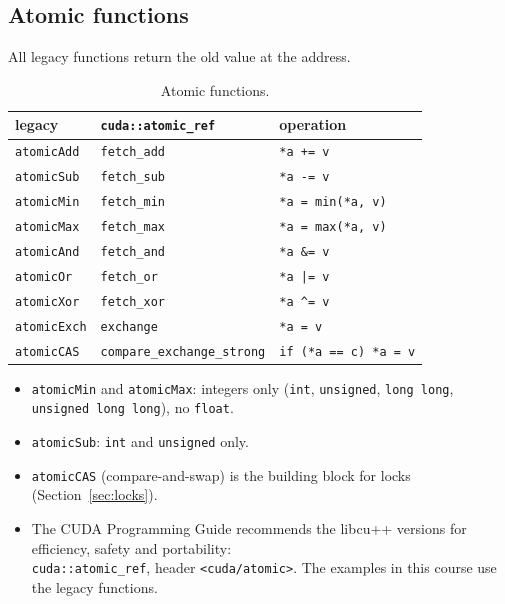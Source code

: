 \documentclass[main.tex]{subfiles}
\begin{document}
\subsection{Atomic functions}

All legacy functions return the old value at the address.

\begin{table}[H]
\centering
\begin{tabular}{l|l|l}
legacy & \texttt{cuda::atomic\_ref} & operation \\ \hline
\texttt{atomicAdd} & \texttt{fetch\_add} & \texttt{*a += v} \\
\texttt{atomicSub} & \texttt{fetch\_sub} & \texttt{*a -= v} \\
\texttt{atomicMin} & \texttt{fetch\_min} & \texttt{*a = min(*a, v)} \\
\texttt{atomicMax} & \texttt{fetch\_max} & \texttt{*a = max(*a, v)} \\
\texttt{atomicAnd} & \texttt{fetch\_and} & \texttt{*a \&= v} \\
\texttt{atomicOr} & \texttt{fetch\_or} & \texttt{*a |= v} \\
\texttt{atomicXor} & \texttt{fetch\_xor} & \texttt{*a \^{}= v} \\
\texttt{atomicExch} & \texttt{exchange} & \texttt{*a = v} \\
\texttt{atomicCAS} & \texttt{compare\_exchange\_strong} & \texttt{if (*a == c) *a = v} \\
\end{tabular}
\caption{Atomic functions.}
\end{table}

\begin{itemize}[nosep]
  \item \texttt{atomicMin} and \texttt{atomicMax}: integers only (\texttt{int}, \texttt{unsigned}, \texttt{long long}, \texttt{unsigned long long}), no \texttt{float}.
  \item \texttt{atomicSub}: \texttt{int} and \texttt{unsigned} only.
  \item \texttt{atomicCAS} (compare-and-swap) is the building block for locks (Section~\ref{sec:locks}).
  \item The CUDA Programming Guide recommends the libcu++ versions for efficiency, safety and portability:\\
    \texttt{cuda::atomic\_ref}, header \texttt{<cuda/atomic>}. The examples in this course use the legacy functions.
\end{itemize}
\end{document}
